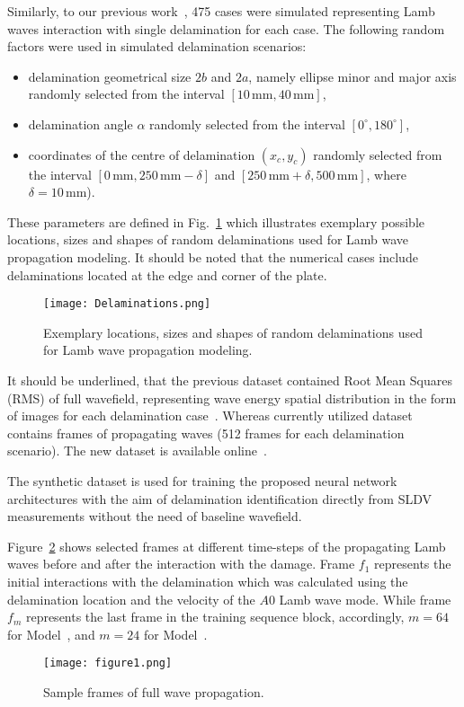 Similarly, to our previous work~\cite{Ijjeh2021}, 475 cases were simulated representing Lamb waves interaction with single delamination for each case. 
The following random factors were used in simulated delamination scenarios:
\begin{itemize}
	\item delamination geometrical size	\(2b\) and \(2a\), namely ellipse minor and major axis randomly selected from the interval \(\left[10 \, \textrm{mm}, 40\, \textrm{mm}\right]\),
	\item delamination angle \(\alpha\) randomly selected from the interval \( \left[ 0^{\circ}, 180^{\circ} \right]\),
	\item coordinates of the centre of delamination \((x_c,y_c)\) randomly selected from the interval \(\left[0\, \textrm{mm}, 250\, \textrm{mm} -\delta \right]\) and \( \left[250\, \textrm{mm}+\delta, 500\, \textrm{mm} \right] \), where \(\delta = 10\, \textrm{mm}\)).
\end{itemize}
These parameters are defined in Fig.~\ref{fig:random_delaminations} which illustrates exemplary possible locations, sizes and shapes of random delaminations used for Lamb wave propagation modeling.
It should be noted that the numerical cases include delaminations located at the edge and corner of the plate.
\begin{figure}[!h]
	\centering
	\texttt{[image: Delaminations.png]}
	\caption{Exemplary locations, sizes and shapes of random delaminations used for Lamb wave propagation modeling.}
	\label{fig:random_delaminations}
\end{figure}

It should be underlined, that the previous dataset contained Root Mean Squares (RMS) of full wavefield, representing wave energy spatial distribution in the form of images for each delamination case~\cite{Kudela2020d}. 
Whereas currently utilized dataset contains frames of propagating waves (512 frames for each delamination scenario). 
The new dataset is available online~\cite{kudela_pawel_2021_5414555}.

The synthetic dataset is used for training the proposed neural network architectures with the aim of delamination identification directly from SLDV measurements without the need of baseline wavefield.

Figure~\ref{fig:Full_wave} shows selected frames at different time-steps of the propagating Lamb waves before and after the interaction with the damage.
Frame \(f_{1}\) represents the initial interactions with the delamination which was calculated using the delamination location and the velocity of the \(A0\) Lamb wave mode.
While frame \(f_{m}\) represents the last frame in the training sequence block, accordingly, \(m=64\) for Model~, and \(m=24\) for Model~.
\begin{figure}[!h]
	\centering
	\texttt{[image: figure1.png]}
	\caption{Sample frames of full wave propagation.}
	\label{fig:Full_wave}
\end{figure}

